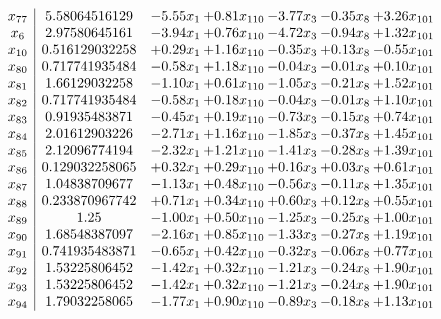 \documentclass[8pt]{article}
\begin{document}
\[\begin{array}{c| c c@{\hskip 2pt} c@{\hskip 2pt} c@{\hskip 2pt} c@{\hskip 2pt} c@{\hskip 2pt} }
 x_{77}   &  5.58064516129 & -5.55 x_{1} & +  0.81 x_{110} & -3.77 x_{3} & -0.35 x_{8} & +  3.26 x_{101}\\
 x_{6}   &  2.97580645161 & -3.94 x_{1} & +  0.76 x_{110} & -4.72 x_{3} & -0.94 x_{8} & +  1.32 x_{101}\\
 x_{10}   &  0.516129032258 & +  0.29 x_{1} & +  1.16 x_{110} & -0.35 x_{3} & +  0.13 x_{8} & -0.55 x_{101}\\
 x_{80}   &  0.717741935484 & -0.58 x_{1} & +  1.18 x_{110} & -0.04 x_{3} & -0.01 x_{8} & +  0.10 x_{101}\\
 x_{81}   &  1.66129032258 & -1.10 x_{1} & +  0.61 x_{110} & -1.05 x_{3} & -0.21 x_{8} & +  1.52 x_{101}\\
 x_{82}   &  0.717741935484 & -0.58 x_{1} & +  0.18 x_{110} & -0.04 x_{3} & -0.01 x_{8} & +  1.10 x_{101}\\
 x_{83}   &  0.91935483871 & -0.45 x_{1} & +  0.19 x_{110} & -0.73 x_{3} & -0.15 x_{8} & +  0.74 x_{101}\\
 x_{84}   &  2.01612903226 & -2.71 x_{1} & +  1.16 x_{110} & -1.85 x_{3} & -0.37 x_{8} & +  1.45 x_{101}\\
 x_{85}   &  2.12096774194 & -2.32 x_{1} & +  1.21 x_{110} & -1.41 x_{3} & -0.28 x_{8} & +  1.39 x_{101}\\
 x_{86}   &  0.129032258065 & +  0.32 x_{1} & +  0.29 x_{110} & +  0.16 x_{3} & +  0.03 x_{8} & +  0.61 x_{101}\\
 x_{87}   &  1.04838709677 & -1.13 x_{1} & +  0.48 x_{110} & -0.56 x_{3} & -0.11 x_{8} & +  1.35 x_{101}\\
 x_{88}   &  0.233870967742 & +  0.71 x_{1} & +  0.34 x_{110} & +  0.60 x_{3} & +  0.12 x_{8} & +  0.55 x_{101}\\
 x_{89}   &  1.25 & -1.00 x_{1} & +  0.50 x_{110} & -1.25 x_{3} & -0.25 x_{8} & +  1.00 x_{101}\\
 x_{90}   &  1.68548387097 & -2.16 x_{1} & +  0.85 x_{110} & -1.33 x_{3} & -0.27 x_{8} & +  1.19 x_{101}\\
 x_{91}   &  0.741935483871 & -0.65 x_{1} & +  0.42 x_{110} & -0.32 x_{3} & -0.06 x_{8} & +  0.77 x_{101}\\
 x_{92}   &  1.53225806452 & -1.42 x_{1} & +  0.32 x_{110} & -1.21 x_{3} & -0.24 x_{8} & +  1.90 x_{101}\\
 x_{93}   &  1.53225806452 & -1.42 x_{1} & +  0.32 x_{110} & -1.21 x_{3} & -0.24 x_{8} & +  1.90 x_{101}\\
 x_{94}   &  1.79032258065 & -1.77 x_{1} & +  0.90 x_{110} & -0.89 x_{3} & -0.18 x_{8} & +  1.13 x_{101}\\

\end{array}\]
\end{document}
